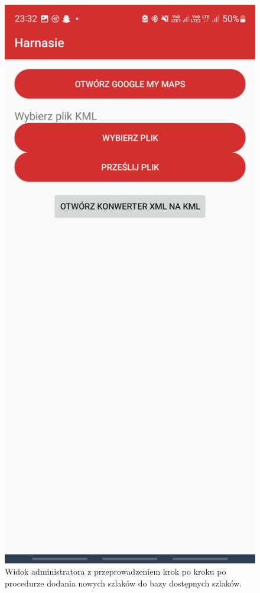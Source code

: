 \begin{figure}[H]
    \centering
    \includegraphics[scale=0.15]{img/imp/widok-dodajkml.jpg}
    \caption{Widok administratora z przeprowadzeniem krok po kroku po procedurze dodania nowych szlaków do bazy dostępnych szlaków.}
    \label{widok:kml}
\end{figure}







